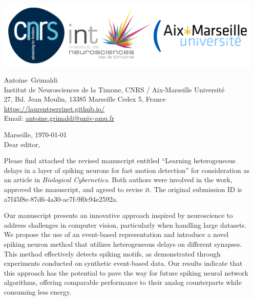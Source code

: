 \documentclass[10pt,english]{article}
\makeatletter
\newcommand{\LastName}{Grimaldi}%
\newcommand{\FirstName}{Antoine}%
\newcommand{\Institute}{Institut de Neurosciences de la Timone, CNRS / Aix-Marseille Universit\'e}%
\newcommand{\Address}{27, Bd. Jean Moulin, 13385 Marseille Cedex 5, France}%
\newcommand{\Website}{\url{https://laurentperrinet.github.io/}}%
\newcommand{\Email}{\url{antoine.grimaldi@univ-amu.fr}}%
\makeatother
\begin{document}
\includegraphics[width=.4\textwidth]{troislogos.png}
\\
\vspace{.1\baselineskip}
\hrulefill
\vspace{.1\baselineskip}

\begin{flushright}
	\FirstName\  \LastName\  \\
	\Institute\\[6pt]
	\Address\\%
	\Website \\
	  Email: \Email \\[6pt]
\end{flushright}
\justifying
\vspace{1\baselineskip}
Marseille, 
\today
\\[12pt] %
	
Dear editor,

Please find attached the revised manuscript entitled ``Learning heterogeneous delays in a layer of spiking neurons for fast motion detection'' for consideration as an article in \emph{Biological Cybernetics}. Both authors were involved in the work, approved the manuscript, and agreed to revise it. The original submission ID is a7f45f8e-87d6-4a30-ac7f-9f0c94e2592a. 

Our manuscript presents an innovative approach inspired by neuroscience to address challenges in computer vision, particularly when handling large datasets. We propose the use of an event-based representation and introduce a novel spiking neuron method that utilizes heterogeneous delays on different synapses. This method effectively detects spiking motifs, as demonstrated through experiments conducted on synthetic event-based data. Our results indicate that this approach has the potential to pave the way for future spiking neural network algorithms, offering comparable performance to their analog counterparts while consuming less energy.
\end{document}
